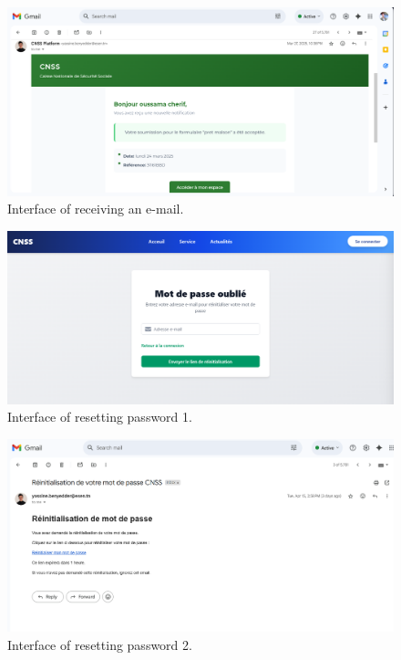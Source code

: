 \clearpage
\begin{figure}[h!]
    \centering
    \includegraphics[width=1\textwidth]{figures/ui-receive emails.png}
    \caption{Interface of receiving an e-mail.}
\end{figure}
\vspace{1.5cm}
\begin{figure}[h!]
    \centering
    \includegraphics[width=1\textwidth]{figures/ui-reset pass1.png}
    \caption{Interface of resetting password 1.}
\end{figure}
\clearpage
\begin{figure}[h!]
    \centering
    \includegraphics[width=1\textwidth]{figures/ui-reset pass2.png}
    \caption{Interface of resetting password 2.}
\end{figure}
